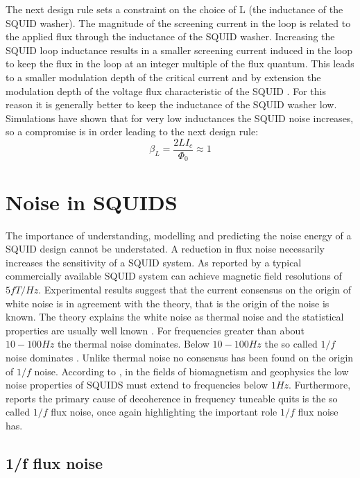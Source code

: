 The next design rule sets a constraint on the choice of L (the inductance of the SQUID washer). The magnitude of the screening current in the loop is related to the applied flux through the inductance of the SQUID washer. Increasing the SQUID loop inductance results in a smaller screening current induced in the loop to keep the flux in the loop at an integer multiple of the flux quantum. This leads to a smaller modulation depth of the critical current and by extension the modulation depth of the voltage flux characteristic of the SQUID \cite{Drung2016NBSQUIDS}. For this reason it is generally better to keep the inductance of the SQUID washer low. Simulations have shown that for very low inductances the SQUID noise increases, so a compromise is in order \cite{Drung2016NBSQUIDS} leading to the next design rule: 
\begin{equation}
    \beta_L = \frac{2LI_c}{\Phi_0} \approx 1
    \label{eq:SQUIDmodDepth}
\end{equation}

\section{Noise in SQUIDS}
The importance of understanding, modelling and predicting the noise energy of a SQUID design cannot be understated. A reduction in flux noise necessarily increases the sensitivity of a SQUID system. As reported by \cite{LowNoiseGrad} a typical commercially available SQUID system can achieve magnetic field resolutions of $5 \si{fT/Hz}$. Experimental results suggest that the current consensus on the origin of white noise is in agreement with the theory, that is the origin of the noise is known. The theory explains the white noise as thermal noise and the statistical properties are usually well known \cite{Drung2016NBSQUIDS} \cite{SQUIDhandbook}. For frequencies greater than about $10 - 100\si{Hz}$ the thermal noise dominates. Below $10 - 100\si{Hz}$ the so called $1/f$ noise dominates \cite{DCSQUIDdesignImage}. Unlike thermal noise no consensus has been found on the origin of $1/f$ noise. According to \cite{SQUIDhandbook}, in the fields of biomagnetism and geophysics the low noise properties of SQUIDS must extend to frequencies below $1\si{Hz}$. Furthermore, \cite{QubitPerf} reports the primary cause of decoherence in frequency tuneable quits is the so called $1/f$ flux noise, once again highlighting the important role $1/f$ flux noise has.


\subsection{1/f flux noise}
